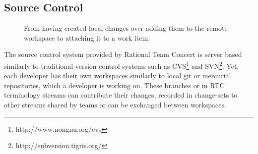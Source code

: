 \subsection{Source Control}
\begin{figure}
\centering
{}


\caption{From having created local changes over adding them to the remote workspace to attaching it to a work item.}
\label{fig:changeset}
\end{figure}

The source control system provided by Rational Team Concert is server based similarly to traditional version control systems such as CVS\footnote{http://www.nongnu.org/cvs} and SVN\footnote{http://subversion.tigris.org/}.
Yet, each developer has their own workspaces similarly to local git or mercurial repositories, which a developer is working on.
These branches or in RTC terminology streams can contribute their changes, recorded in change-sets to other streams shared by teams or can be exchanged between workspaces.

